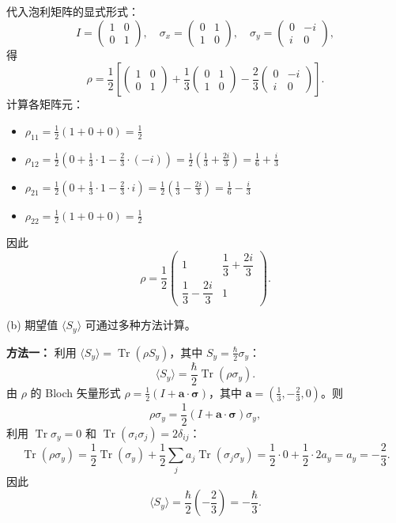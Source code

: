 \begin{solution}
代入泡利矩阵的显式形式：
\[
I = \begin{pmatrix}1&0\\0&1\end{pmatrix},\quad
\sigma_x = \begin{pmatrix}0&1\\1&0\end{pmatrix},\quad
\sigma_y = \begin{pmatrix}0&-i\\i&0\end{pmatrix},
\]
得
\[
\rho = \frac{1}{2}\left[
\begin{pmatrix}1&0\\0&1\end{pmatrix}
+ \frac{1}{3}\begin{pmatrix}0&1\\1&0\end{pmatrix}
- \frac{2}{3}\begin{pmatrix}0&-i\\i&0\end{pmatrix}
\right].
\]
计算各矩阵元：
\begin{itemize}
\item $\rho_{11} = \frac{1}{2}(1 + 0 + 0) = \frac{1}{2}$
\item $\rho_{12} = \frac{1}{2}\left(0 + \frac{1}{3}\cdot 1 - \frac{2}{3}\cdot(-i)\right) = \frac{1}{2}\left(\frac{1}{3} + \frac{2i}{3}\right) = \frac{1}{6} + \frac{i}{3}$
\item $\rho_{21} = \frac{1}{2}\left(0 + \frac{1}{3}\cdot 1 - \frac{2}{3}\cdot i\right) = \frac{1}{2}\left(\frac{1}{3} - \frac{2i}{3}\right) = \frac{1}{6} - \frac{i}{3}$
\item $\rho_{22} = \frac{1}{2}(1 + 0 + 0) = \frac{1}{2}$
\end{itemize}
因此
\[
\boxed{\rho = \frac{1}{2}\begin{pmatrix}
1 & \dfrac{1}{3} + \dfrac{2i}{3}\\[6pt]
\dfrac{1}{3} - \dfrac{2i}{3} & 1
\end{pmatrix}.}
\]

(b) 期望值 $\langle S_y\rangle$ 可通过多种方法计算。

\textbf{方法一：} 利用 $\langle S_y\rangle = \operatorname{Tr}(\rho S_y)$，其中 $S_y = \frac{\hbar}{2}\sigma_y$：
\[
\langle S_y\rangle = \frac{\hbar}{2}\operatorname{Tr}(\rho\sigma_y).
\]
由 $\rho$ 的 Bloch 矢量形式 $\rho = \frac{1}{2}(I + \mathbf a\cdot\boldsymbol\sigma)$，其中 $\mathbf a = \left(\frac{1}{3}, -\frac{2}{3}, 0\right)$。则
\[
\rho\sigma_y = \frac{1}{2}(I + \mathbf a\cdot\boldsymbol\sigma)\sigma_y,
\]
利用 $\operatorname{Tr}\sigma_y = 0$ 和 $\operatorname{Tr}(\sigma_i\sigma_j)=2\delta_{ij}$：
\[
\operatorname{Tr}(\rho\sigma_y) = \frac{1}{2}\operatorname{Tr}(\sigma_y) + \frac{1}{2}\sum_j a_j\operatorname{Tr}(\sigma_j\sigma_y) = \frac{1}{2}\cdot 0 + \frac{1}{2}\cdot 2a_y = a_y = -\frac{2}{3}.
\]
因此
\[
\boxed{\langle S_y\rangle = \frac{\hbar}{2}\left(-\frac{2}{3}\right) = -\frac{\hbar}{3}.}
\]


\end{solution}
